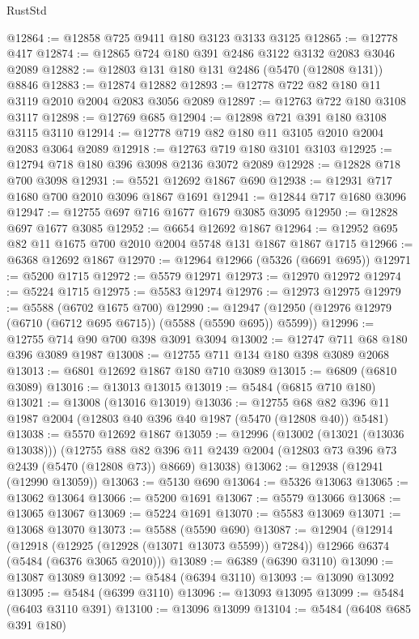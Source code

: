 \begin{lexlean}{RustStd}
\begin{coremodule}
{\begin{coremodule}
{{{{{{{{{{{{{{{{{{{{{{{{{{{{{{{@12864 := @12858 @725 @9411 @180 @3123 @3133 @3125
@12865 := @12778 @417
@12874 := @12865 @724 @180 @391 @2486 @3122 @3132 @2083 @3046 @2089
@12882 := @12803 @131 @180 @131 @2486 (@5470 (@12808 @131)) @8846
@12883 := @12874 @12882
@12893 := @12778 @722 @82 @180 @11 @3119 @2010 @2004 @2083 @3056 @2089
@12897 := @12763 @722 @180 @3108 @3117
@12898 := @12769 @685
@12904 := @12898 @721 @391 @180 @3108 @3115 @3110
@12914 := @12778 @719 @82 @180 @11 @3105 @2010 @2004 @2083 @3064 @2089
@12918 := @12763 @719 @180 @3101 @3103
@12925 := @12794 @718 @180 @396 @3098 @2136 @3072 @2089
@12928 := @12828 @718 @700 @3098
@12931 := @5521 @12692 @1867 @690
@12938 := @12931 @717 @1680 @700 @2010 @3096 @1867 @1691
@12941 := @12844 @717 @1680 @3096
@12947 := @12755 @697 @716 @1677 @1679 @3085 @3095
@12950 := @12828 @697 @1677 @3085
@12952 := @6654 @12692 @1867
@12964 := @12952 @695 @82 @11 @1675 @700 @2010 @2004 @5748 @131 @1867 @1867 @1715
@12966 := @6368 @12692 @1867
@12970 := @12964 @12966 (@5326 (@6691 @695))
@12971 := @5200 @1715
@12972 := @5579 @12971
@12973 := @12970 @12972
@12974 := @5224 @1715
@12975 := @5583 @12974
@12976 := @12973 @12975
@12979 := @5588 (@6702 @1675 @700)
@12990 := @12947 (@12950 (@12976 @12979 (@6710 (@6712 @695 @6715)) (@5588 (@5590 @695)) @5599))
@12996 := @12755 @714 @90 @700 @398 @3091 @3094
@13002 := @12747 @711 @68 @180 @396 @3089 @1987
@13008 := @12755 @711 @134 @180 @398 @3089 @2068
@13013 := @6801 @12692 @1867 @180 @710 @3089
@13015 := @6809 (@6810 @3089)
@13016 := @13013 @13015
@13019 := @5484 (@6815 @710 @180)
@13021 := @13008 (@13016 @13019)
@13036 := @12755 @68 @82 @396 @11 @1987 @2004 (@12803 @40 @396 @40 @1987 (@5470 (@12808 @40)) @5481)
@13038 := @5570 @12692 @1867
@13059 := @12996
    (@13002 (@13021 (@13036 @13038)))
    (@12755
      @88
      @82
      @396
      @11
      @2439
      @2004
      (@12803 @73 @396 @73 @2439 (@5470 (@12808 @73)) @8669)
      @13038)
@13062 := @12938 (@12941 (@12990 @13059))
@13063 := @5130 @690
@13064 := @5326 @13063
@13065 := @13062 @13064
@13066 := @5200 @1691
@13067 := @5579 @13066
@13068 := @13065 @13067
@13069 := @5224 @1691
@13070 := @5583 @13069
@13071 := @13068 @13070
@13073 := @5588 (@5590 @690)
@13087 := @12904
    (@12914
      (@12918 (@12925 (@12928 (@13071 @13073 @5599)) @7284))
      @12966
      @6374
      (@5484 (@6376 @3065 @2010)))
@13089 := @6389 (@6390 @3110)
@13090 := @13087 @13089
@13092 := @5484 (@6394 @3110)
@13093 := @13090 @13092
@13095 := @5484 (@6399 @3110)
@13096 := @13093 @13095
@13099 := @5484 (@6403 @3110 @391)
@13100 := @13096 @13099
@13104 := @5484 (@6408 @685 @391 @180)
}}}}}}}}}}}}}}}}}}}}}}}}}}}}}}}
\end{coremodule}}
\end{coremodule}
\end{lexlean}

